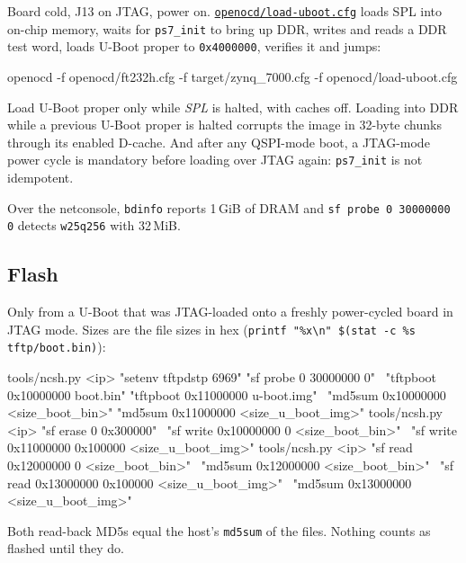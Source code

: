 \documentclass[11pt,a4paper,oneside]{article}
\newcommand{\cmd}[1]{\texttt{#1}}
\newcommand{\repo}{https://github.com/MaxClerkwell/ax7020-bringup}
\newcommand{\rfile}[1]{\href{\repo/blob/master/#1}{\color{bluemid}\nolinkurl{#1}}}
\begin{document}
Board cold, J13 on JTAG, power on. \rfile{openocd/load-uboot.cfg} loads SPL
into on-chip memory, waits for \cmd{ps7\_init} to bring up DDR, writes and
reads a DDR test word, loads U-Boot proper to \cmd{0x4000000}, verifies it
and jumps:

\begin{shell}
openocd -f openocd/ft232h.cfg -f target/zynq_7000.cfg -f openocd/load-uboot.cfg
\end{shell}

\begin{mustknow}
Load U-Boot proper only while \emph{SPL} is halted, with caches off. Loading
into DDR while a previous U-Boot proper is halted corrupts the image in
32-byte chunks through its enabled D-cache. And after any QSPI-mode boot, a
JTAG-mode power cycle is mandatory before loading over JTAG again:
\cmd{ps7\_init} is not idempotent.
\end{mustknow}

\begin{checkpoint}
Over the netconsole, \cmd{bdinfo} reports 1\,GiB of DRAM and
\cmd{sf probe 0 30000000 0} detects \cmd{w25q256} with 32\,MiB.
\end{checkpoint}

\subsection{Flash}

Only from a U-Boot that was JTAG-loaded onto a freshly power-cycled board in
JTAG mode. Sizes are the file sizes in hex
(\cmd{printf "\%x\textbackslash n" \$(stat -c \%s tftp/boot.bin)}):

\begin{shell}
tools/ncsh.py <ip> "setenv tftpdstp 6969" "sf probe 0 30000000 0" \
  "tftpboot 0x10000000 boot.bin" "tftpboot 0x11000000 u-boot.img" \
  "md5sum 0x10000000 <size_boot_bin>" "md5sum 0x11000000 <size_u_boot_img>"
tools/ncsh.py <ip> "sf erase 0 0x300000" \
  "sf write 0x10000000 0 <size_boot_bin>" \
  "sf write 0x11000000 0x100000 <size_u_boot_img>"
tools/ncsh.py <ip> "sf read 0x12000000 0 <size_boot_bin>" \
  "md5sum 0x12000000 <size_boot_bin>" \
  "sf read 0x13000000 0x100000 <size_u_boot_img>" \
  "md5sum 0x13000000 <size_u_boot_img>"
\end{shell}

\begin{checkpoint}
Both read-back MD5s equal the host's \cmd{md5sum} of the files. Nothing
counts as flashed until they do.
\end{checkpoint}
\end{document}
